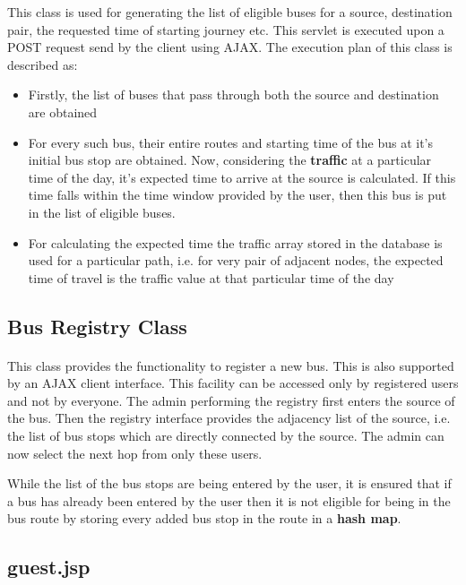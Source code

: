 \documentclass[11pt]{article}
\begin{document}
This class is used for generating the list of eligible buses for a source, destination pair, the requested time of starting journey etc. This servlet is executed upon a POST request send by the client using AJAX. The execution plan of this class is described as:
\begin{itemize}
\item Firstly, the list of buses that pass through both the source and destination are obtained 
\item For every such bus, their entire routes and starting time of the bus at it's initial bus stop are obtained. Now, considering the \textbf{traffic} at a particular time of the day, it's expected time to arrive at the source is calculated. If this time falls within the time window provided by the user, then this bus is put in the list of eligible buses. 

\item For calculating the expected time the traffic array stored in the database is used for a particular path, i.e. for very pair of adjacent nodes, the expected time of travel is the traffic value at that particular time of the day 

\end{itemize}
\subsection{Bus Registry Class}
\paragraph{}

This class provides the functionality to register a new bus. This is also supported by an AJAX client interface. This facility can be accessed only by registered users and not by everyone. The admin performing the registry first enters the source of the bus. Then the registry interface provides the adjacency list of the source, i.e. the list of bus stops which are directly connected by the source. The admin can now select the next hop from only these users. 

While the list of the bus stops are being entered by the user, it is ensured that if a bus has already been entered by the user then it is not eligible for being in the bus route by storing every added bus stop in the route in a \textbf{hash map}.

\subsection{guest.jsp}
\end{document}
